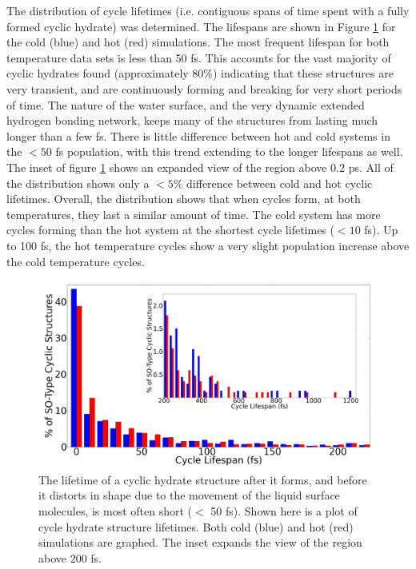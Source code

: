 \documentclass{article}
\begin{document}
The distribution of cycle lifetimes (i.e. contiguous spans of time spent with a fully formed cyclic hydrate) was determined. The lifespans are shown in Figure \ref{fig:cycle-lifespans} for the cold (blue) and hot (red) simulations. The most frequent lifespan for both temperature data sets is less than 50 fs. This accounts for the vast majority of cyclic hydrates found (approximately 80\%) indicating that these structures are very transient, and are continuously forming and breaking for very short periods of time. The nature of the water surface, and the very dynamic extended hydrogen bonding network, keeps many of the structures from lasting much longer than a few fs. There is little difference between hot and cold systems in the $<50$ fs population, with this trend extending to the longer lifespans as well. The inset of figure \ref{fig:cycle-lifespans} shows an expanded view of the region above 0.2 ps. All of the distribution shows only a $<5$\% difference between cold and hot cyclic lifetimes. Overall, the distribution shows that when cycles form, at both temperatures, they last a similar amount of time. The cold system has more cycles forming than the hot system at the shortest cycle lifetimes ($<10$ fs). Up to 100 fs, the hot temperature cycles show a very slight population increase above the cold temperature cycles.

\begin{figure}[h!]
	\begin{center}
		\includegraphics[scale=1.0]{cycle-lifespans.png}
		\caption{The lifetime of a cyclic hydrate structure after it forms, and before it distorts in shape due to the movement of the liquid surface molecules, is most often short ($<$ 50 fs). Shown here is a plot of cycle hydrate structure lifetimes. Both cold (blue) and hot (red) simulations are graphed. The inset expands the view of the region above 200 fs.}
		\label{fig:cycle-lifespans}
	\end{center}
\end{figure}
\end{document}
